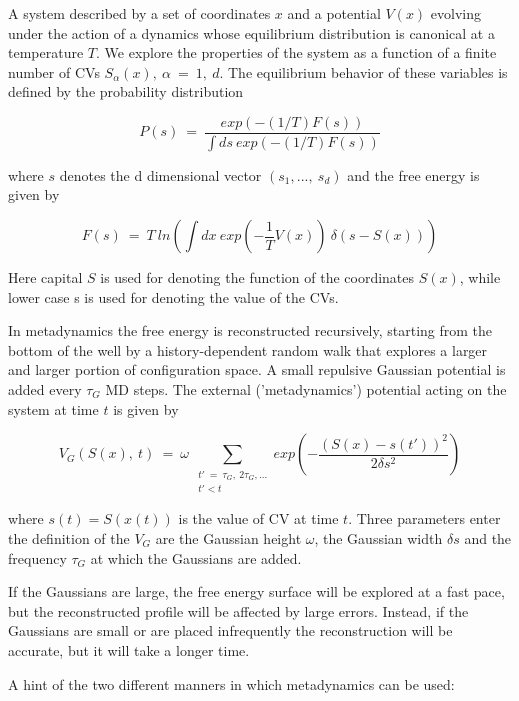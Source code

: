 \documentclass[12pt,a4paper]{article}
\begin{document}
A system described by a set of coordinates $x$ and a potential $V(x)$ evolving under the action of a dynamics whose equilibrium distribution is canonical at a temperature $T$. We explore the properties of the system as a function of a finite number of CVs $S_{\alpha}(x), ~\alpha ~= ~1, ~d$. The equilibrium behavior of these variables is defined by the probability distribution

\begin{equation}
P(s)~=~\frac{exp(-(1/T)F(s))}{\int{ds~exp(-(1/T)F(s))}}
\label{EQ_prob}
\end{equation}

where $s$ denotes the d dimensional vector $(s_{1},..., ~s_{d})$ and the free energy is given by

\begin{equation}
F(s) ~= ~T ~ln(\int{dx ~exp(-\frac{1}{T}V(x))} ~\delta(s-S(x)))
\label{EQ_free_energy}
\end{equation}

Here capital $S$ is used for denoting the function of the coordinates $S(x)$, while lower case s is used for denoting the value of the CVs.

In metadynamics the free energy is reconstructed recursively, starting from the bottom of the well by a history-dependent random walk that explores a larger and larger portion of configuration space. A small repulsive Gaussian potential is added every $\tau_{G}$ MD steps. The external ('metadynamics') potential acting on the system at time $t$ is given by

\begin{equation}
V_{G}(S(x), ~t) ~= ~\omega ~\sum_{\substack{t' ~= ~\tau_{G}, ~2\tau_{G},...\\t'<t}}exp(-\frac{(S(x)-s(t'))^{2}}{2\delta s^{2}})
\label{EQ_vg}
\end{equation}

where $s(t) = S(x(t))$ is the value of CV at time $t$. Three parameters enter the definition of the $V_{G}$ are the Gaussian height $\omega$, the Gaussian width $\delta s$ and the frequency $\tau_{G}$ at which the Gaussians are added.

If the Gaussians are large, the free energy surface will be explored at a fast pace, but the reconstructed profile will be affected by large errors. Instead, if the Gaussians are small or are placed infrequently the reconstruction will be accurate, but it will take a longer time.

A hint of the two different manners in which metadynamics can be used:
\end{document}
